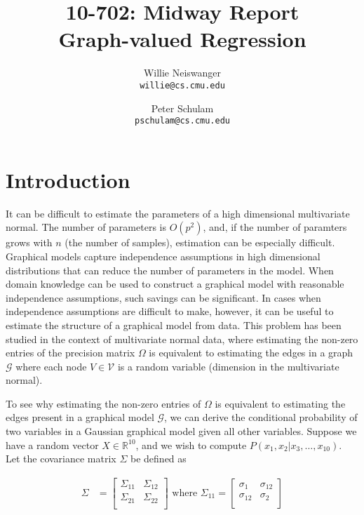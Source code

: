 \documentclass[12pt]{article}
\title{10-702: Midway Report\\
Graph-valued Regression}
\author{Willie Neiswanger\\
\texttt{willie@cs.cmu.edu}
\and
Peter Schulam\\
\texttt{pschulam@cs.cmu.edu}}
\begin{document}
\maketitle

\section{Introduction}
\label{sec:introduction}

It can be difficult to estimate the parameters of a high dimensional
multivariate normal. The number of parameters is $O(p^2)$, and, if the
number of paramters grows with $n$ (the number of samples), estimation
can be especially difficult. Graphical models capture independence
assumptions in high dimensional distributions that can reduce the
number of parameters in the model. When domain knowledge can be used
to construct a graphical model with reasonable independence
assumptions, such savings can be significant. In cases when
independence assumptions are difficult to make, however, it can be
useful to estimate the structure of a graphical model from data. This
problem has been studied in the context of multivariate normal data,
where estimating the non-zero entries of the precision matrix $\Omega$
is equivalent to estimating the edges in a graph $\mathcal{G}$ where
each node $V \in \mathcal{V}$ is a random variable (dimension in the
multivariate normal).

To see why estimating the non-zero entries of $\Omega$ is equivalent
to estimating the edges present in a graphical model $\mathcal{G}$, we
can derive the conditional probability of two variables in a Gaussian
graphical model given all other variables. Suppose we have a random
vector $X \in \mathbb{R}^{10}$, and we wish to compute $P(x_1, x_2 |
x_3, \ldots, x_{10})$. Let the covariance matrix $\Sigma$ be defined
as

\begin{align}
    \Sigma &= \begin{bmatrix}
        \Sigma_{11} & \Sigma_{12} \\
        \Sigma_{21} & \Sigma_{22} \\
    \end{bmatrix}
    \text{ where }
    \Sigma_{11} = \begin{bmatrix}
        \sigma_{1} & \sigma_{12} \\
        \sigma_{12} & \sigma_{2} \\
    \end{bmatrix}
\end{align}
\end{document}
